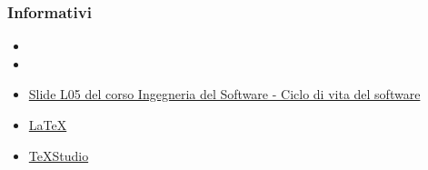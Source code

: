 \subsubsection{Informativi}
\begin{itemize}
	\item {}
	\item {}
	\item \href{https://www.math.unipd.it/~tullio/IS-1/2019/Dispense/L05.pdf}{Slide L05 del corso Ingegneria del Software - Ciclo di vita del software}
	\item \href{https://www.latex-project.org/help/documentation/}{\LaTeX}
	\item \href{https://www.texstudio.org/}{TeXStudio}
\end{itemize}

